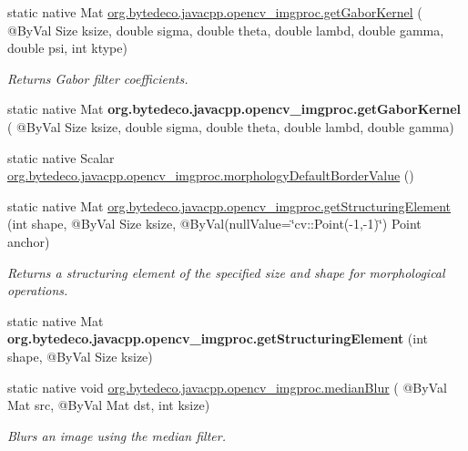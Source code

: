 \begin{DoxyCompactItemize}
\item 
static native Mat \hyperlink{group__imgproc__filter_ga8c30992daccc2467cea3d7d2f016a9ab}{org.\+bytedeco.\+javacpp.\+opencv\+\_\+imgproc.\+get\+Gabor\+Kernel} ( @By\+Val Size ksize, double sigma, double theta, double lambd, double gamma, double psi, int ktype)
\begin{DoxyCompactList}\small\item\em Returns Gabor filter coefficients. \end{DoxyCompactList}\item 
\mbox{\label{group__imgproc__filter_gae7ca988b2551ca6bc75e4ec85bb116fe}} 
static native Mat {\bfseries org.\+bytedeco.\+javacpp.\+opencv\+\_\+imgproc.\+get\+Gabor\+Kernel} ( @By\+Val Size ksize, double sigma, double theta, double lambd, double gamma)
\item 
static native Scalar \hyperlink{group__imgproc__filter_gaa77a7ec53d115ff76de4c8797d6d83f7}{org.\+bytedeco.\+javacpp.\+opencv\+\_\+imgproc.\+morphology\+Default\+Border\+Value} ()
\item 
static native Mat \hyperlink{group__imgproc__filter_ga18af407581ba537b9095d14090cce31a}{org.\+bytedeco.\+javacpp.\+opencv\+\_\+imgproc.\+get\+Structuring\+Element} (int shape, @By\+Val Size ksize, @By\+Val(null\+Value=\char`\"{}cv\+::\+Point(-\/1,-\/1)\char`\"{}) Point anchor)
\begin{DoxyCompactList}\small\item\em Returns a structuring element of the specified size and shape for morphological operations. \end{DoxyCompactList}\item 
\mbox{\label{group__imgproc__filter_ga0840116f63e9ca427336aed0a2d8ca55}} 
static native Mat {\bfseries org.\+bytedeco.\+javacpp.\+opencv\+\_\+imgproc.\+get\+Structuring\+Element} (int shape, @By\+Val Size ksize)
\item 
static native void \hyperlink{group__imgproc__filter_ga6a7fd362c0b073cd051d4fcb7a9904c9}{org.\+bytedeco.\+javacpp.\+opencv\+\_\+imgproc.\+median\+Blur} ( @By\+Val Mat src, @By\+Val Mat dst, int ksize)
\begin{DoxyCompactList}\small\item\em Blurs an image using the median filter. \end{DoxyCompactList}\item 
\mbox{\label{group__imgproc__filter_gaadee3f7173f2333706cd6c0386947dfe}} 

\end{DoxyCompactItemize}

